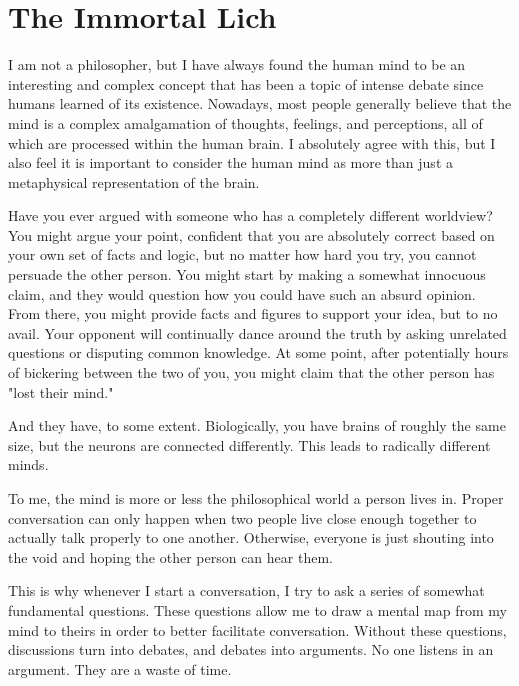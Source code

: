 \chapter{The Immortal Lich}

I am not a philosopher, but I have always found the human mind to be an interesting and complex concept that has been a topic of intense debate since humans learned of its existence.
Nowadays, most people generally believe that the mind is a complex amalgamation of thoughts, feelings, and perceptions, all of which are processed within the human brain.
I absolutely agree with this, but I also feel it is important to consider the human mind as more than just a metaphysical representation of the brain.

Have you ever argued with someone who has a completely different worldview?
You might argue your point, confident that you are absolutely correct based on your own set of facts and logic, but no matter how hard you try, you cannot persuade the other person.
You might start by making a somewhat innocuous claim, and they would question how you could have such an absurd opinion.
From there, you might provide facts and figures to support your idea, but to no avail.
Your opponent will continually dance around the truth by asking unrelated questions or disputing common knowledge.
At some point, after potentially hours of bickering between the two of you, you might claim that the other person has "lost their mind."

And they have, to some extent.
Biologically, you have brains of roughly the same size, but the neurons are connected differently.
This leads to radically different minds.

To me, the mind is more or less the philosophical world a person lives in.
Proper conversation can only happen when two people live close enough together to actually talk properly to one another.
Otherwise, everyone is just shouting into the void and hoping the other person can hear them.

This is why whenever I start a conversation, I try to ask a series of somewhat fundamental questions.
These questions allow me to draw a mental map from my mind to theirs in order to better facilitate conversation.
Without these questions, discussions turn into debates, and debates into arguments.
No one listens in an argument.
They are a waste of time.

